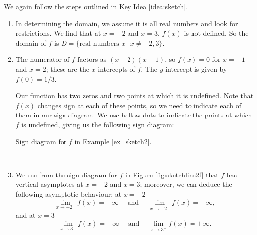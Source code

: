 {We again follow the steps outlined in Key Idea \ref{idea:sketch}.

\begin{enumerate}
		\item	In determining the domain, we assume it is all real numbers and look for restrictions. We find that at $x=-2$ and $x=3$, $f(x)$ is not defined. So the domain of $f$ is $D = \{\text{real numbers } x\ | \ x\neq -2,3\}$.
		\item The numerator of $f$ factors as $(x-2)(x+1)$, so $f(x)=0$ for $x=-1$ and $x=2$; these are the $x$-intercepts of $f$. The $y$-intercept is given by $f(0) = 1/3$.
		
Our function has two zeros and two points at which it is undefined. Note that $f(x)$ changes sign at each of these points, so we need to indicate each of them in our sign diagram. We use hollow dots to indicate the points at which $f$ is undefined, giving us the following sign diagram:

\noindent\begin{minipage}{\textwidth}
\begin{center}
\end{center}
\captionsetup{type=figure}%
			\caption{Sign diagram for $f$ in Example \ref{ex_sketch2}.}\label{fig:sketchline2f}
\end{minipage}\\

		\item We see from the sign diagram for $f$ in Figure \ref{fig:sketchline2f} that $f$ has vertical asymptotes at $x=-2$ and $x=3$; moreover, we can deduce the following asymptotic behaviour: at $x=-2$
\[
\lim_{x\to -2^-}f(x) = +\infty \quad \text{ and } \quad \lim_{x\to -2^+}f(x) = -\infty,
\]
and at $x=3$
\[
\lim_{x\to 3^-}f(x) = -\infty \quad \text{ and } \quad 
\lim_{x\to 3^+}f(x) = +\infty.
\]


\end{enumerate}}
